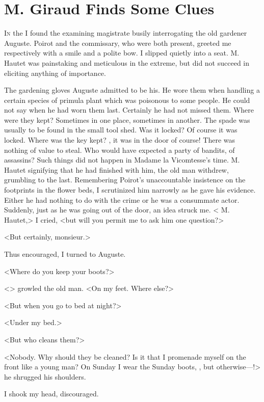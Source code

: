 \chapter{M. Giraud Finds Some Clues}
	
\lettrine{I}{n} the  I found the examining magistrate busily interrogating the old gardener Auguste. Poirot and the commissary, who were both present, greeted me respectively with a smile and a polite bow. I slipped quietly into a seat. M. Hautet was painstaking and meticulous in the extreme, but did not succeed in eliciting anything of importance. 

 The gardening gloves Auguste admitted to be his. He wore them when handling a certain species of primula plant which was poisonous to some people. He could not say when he had worn them last. Certainly he had not missed them. Where were they kept? Sometimes in one place, sometimes in another. The spade was usually to be found in the small tool shed. Was it locked? Of course it was locked. Where was the key kept? , it was in the door of course! There was nothing of value to steal. Who would have expected a party of bandits, of assassins? Such things did not happen in Madame la Vicomtesse's time. M. Hautet signifying that he had finished with him, the old man withdrew, grumbling to the last. Remembering Poirot's unaccountable insistence on the footprints in the flower beds, I scrutinized him narrowly as he gave his evidence. Either he had nothing to do with the crime or he was a consummate actor. Suddenly, just as he was going out of the door, an idea struck me. < M. Hautet,> I cried, <but will you permit me to ask him one question?> 

 <But certainly, monsieur.> 

 Thus encouraged, I turned to Auguste. 

 <Where do you keep your boots?> 

 <> growled the old man. <On my feet. Where else?> 

 <But when you go to bed at night?> 

 <Under my bed.> 

 <But who cleans them?> 

 <Nobody. Why should they be cleaned? Is it that I promenade myself on the front like a young man? On Sunday I wear the Sunday boots, , but otherwise—!> he shrugged his shoulders. 

 I shook my head, discouraged. 

